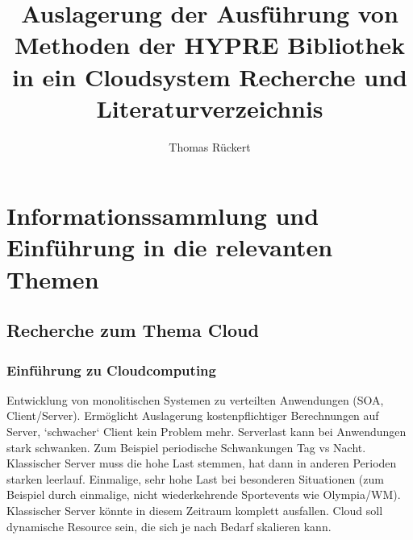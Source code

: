 \documentclass[a4paper,10pt]{article}
\title{Auslagerung der Ausführung von Methoden der HYPRE Bibliothek in ein Cloudsystem
Recherche und Literaturverzeichnis}
\author{Thomas Rückert}
\begin{document}
\maketitle
\newpage

\begin{abstract}

\end{abstract}

\newpage

\tableofcontents

\newpage

\section{Informationssammlung und Einführung in die relevanten Themen}

\subsection{Recherche zum Thema Cloud}

\subsubsection{Einführung zu Cloudcomputing}

Entwicklung von monolitischen Systemen zu verteilten Anwendungen (SOA, Client/Server).
Ermöglicht Auslagerung kostenpflichtiger Berechnungen auf Server, `schwacher` Client kein Problem mehr.
Serverlast kann bei Anwendungen stark schwanken.
Zum Beispiel periodische Schwankungen Tag vs Nacht.
Klassischer Server muss die hohe Last stemmen, hat dann in anderen Perioden starken leerlauf.
Einmalige, sehr hohe Last bei besonderen Situationen (zum Beispiel durch einmalige, nicht wiederkehrende Sportevents wie Olympia/WM).
Klassischer Server könnte in diesem Zeitraum komplett ausfallen.
Cloud soll dynamische Resource sein, die sich je nach Bedarf skalieren kann.
\end{document}
